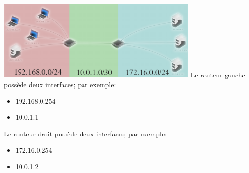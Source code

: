 \documentclass[svgnames,11pt]{beamer}
\begin{document}
\begin{frame}
    \includegraphics[width=10cm]{ressources/deuxreseaux2.png}
    Le routeur gauche possède deux interfaces; par exemple:
    \begin{itemize}
        \item 192.168.0.254
        \item 10.0.1.1
    \end{itemize}
    Le routeur droit possède deux interfaces; par exemple:
    \begin{itemize}
        \item 172.16.0.254
        \item 10.0.1.2
    \end{itemize}
\end{frame}
\end{document}
